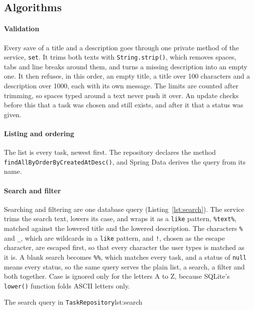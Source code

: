 \subsection{Algorithms}

\paragraph*{Validation} Every save of a title and a description goes through one private method of the service,
\texttt{set}. It trims both texts with \texttt{String.strip()}, which removes spaces, tabs and line breaks around
them, and turns a missing description into an empty one. It then refuses, in this order, an empty title, a title over
100 characters and a description over 1000, each with its own message. The limits are counted after trimming, so
spaces typed around a text never push it over. An update checks before this that a task was chosen and still exists,
and after it that a status was given.

\paragraph*{Listing and ordering} The list is every task, newest first. The repository declares the method
\texttt{findAllByOrderByCreatedAtDesc()}, and Spring Data derives the query from its name.

\paragraph*{Search and filter} Searching and filtering are one database query (Listing~\ref{lst:search}). The service
trims the search text, lowers its case, and wraps it as a \texttt{like} pattern, \texttt{\%text\%}, matched against
the lowered title and the lowered description. The characters \texttt{\%} and \texttt{\_}, which are wildcards in a
\texttt{like} pattern, and \texttt{!}, chosen as the escape character, are escaped first, so that every character the
user types is matched as it is. A blank search becomes \texttt{\%\%}, which matches every task, and a status of
\texttt{null} means every status, so the same query serves the plain list, a search, a filter and both together.
Case is ignored only for the letters A to Z, because SQLite's \texttt{lower()} function folds ASCII letters only.

  {The search query in \texttt{TaskRepository}}{lst:search}

